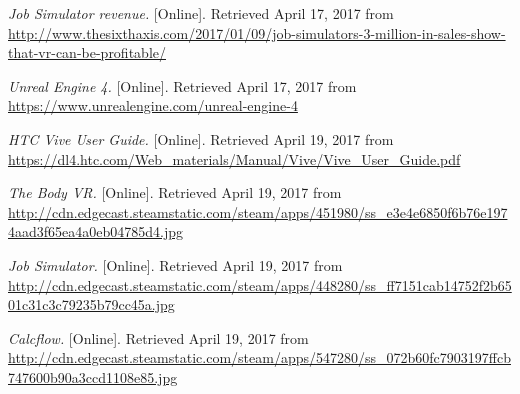 \begin{thebibliography}{1}
\emph{Job Simulator revenue.} [Online]. Retrieved April 17, 2017 from \url{http://www.thesixthaxis.com/2017/01/09/job-simulators-3-million-in-sales-show-that-vr-can-be-profitable/}

\emph{Unreal Engine 4.} [Online]. Retrieved April 17, 2017 from \url{https://www.unrealengine.com/unreal-engine-4}

\emph{HTC Vive User Guide.} [Online]. Retrieved April 19, 2017 from \url{https://dl4.htc.com/Web_materials/Manual/Vive/Vive_User_Guide.pdf}

\emph{The Body VR.} [Online]. Retrieved April 19, 2017 from \url{http://cdn.edgecast.steamstatic.com/steam/apps/451980/ss_e3e4e6850f6b76e1974aad3f65ea4a0eb04785d4.jpg}

\emph{Job Simulator.} [Online]. Retrieved April 19, 2017 from \url{http://cdn.edgecast.steamstatic.com/steam/apps/448280/ss_ff7151cab14752f2b6501c31c3c79235b79cc45a.jpg}

\emph{Calcflow.} [Online]. Retrieved April 19, 2017 from \url{http://cdn.edgecast.steamstatic.com/steam/apps/547280/ss_072b60fc7903197ffcb747600b90a3ccd1108e85.jpg}



\end{thebibliography}
